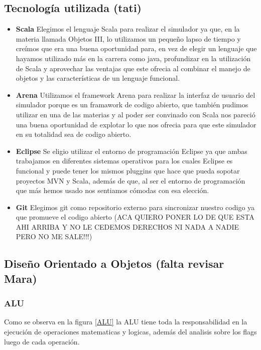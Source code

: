 \subsection{Tecnología utilizada (tati)}

\begin{itemize}


\item  \textbf{Scala}
Elegimos el lenguaje Scala para realizar el simulador ya que, en la materia llamada Objetos III, lo utilizamos un pequeño lapso de tiempo y creímos que era una buena oportunidad para, en vez de elegir un lenguaje que hayamos utilizado más en la carrera como java, profundizar en la utilización de Scala y aprovechar las ventajas que este ofrecia al combinar el manejo de objetos y las características de un lenguaje funcional.

\item  \textbf{Arena}
Utilizamos el framework Arena para realizar la interfaz de usuario del simulador porque es un framawork de codigo abierto, que también pudimos utilizar en una de las materias y al poder ser convinado con Scala nos pareció una buena oportunidad de explotar lo que nos ofrecia para que este simulador en su totalidad sea de codigo abierto.

\item  \textbf{Eclipse}
Se eligio utilizar el entorno de programación Eclipse ya que ambas trabajamos en diferentes sistemas operativos para los cuales Eclipse es funcional y puede tener los mismos pluggins que hace que pueda sopotar proyectos MVN y Scala, además de que, al ser el entorno de programación que más hemos usado nos sentiamos cómodas con esa elección.

\item  \textbf{Git}
Elegimos git como repositorio externo para sincronizar nuestro codigo ya que promueve el codigo abierto (ACA QUIERO PONER LO DE QUE ESTA AHI ARRIBA Y NO LE CEDEMOS DERECHOS NI NADA  A NADIE PERO NO ME SALE!!!)

\end{itemize}

\subsection{Diseño Orientado a Objetos  (falta revisar Mara)}

\subsubsection{ALU}
Como se observa en la figura \ref{ALU} la ALU tiene toda la responsabilidad en la ejecución de operaciones matematicas y logicas, además del analisis sobre los flags luego de cada operación. 

